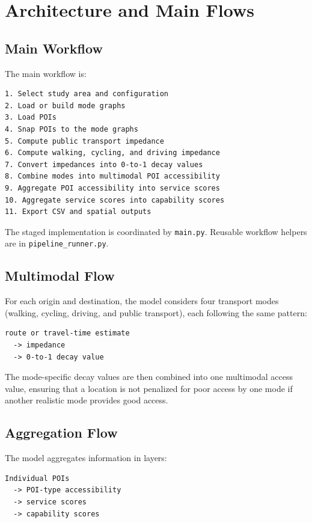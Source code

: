 \documentclass[11pt]{article}
\begin{document}
\section{Architecture and Main Flows}

\subsection*{Main Workflow}

The main workflow is:

\begin{verbatim}
1. Select study area and configuration
2. Load or build mode graphs
3. Load POIs
4. Snap POIs to the mode graphs
5. Compute public transport impedance
6. Compute walking, cycling, and driving impedance
7. Convert impedances into 0-to-1 decay values
8. Combine modes into multimodal POI accessibility
9. Aggregate POI accessibility into service scores
10. Aggregate service scores into capability scores
11. Export CSV and spatial outputs
\end{verbatim}

The staged implementation is coordinated by \texttt{main.py}. Reusable workflow helpers are in \texttt{pipeline\_runner.py}.

\subsection*{Multimodal Flow}

For each origin and destination, the model considers four transport modes (walking, cycling, driving, and public transport), each following the same pattern:

\begin{verbatim}
route or travel-time estimate
  -> impedance
  -> 0-to-1 decay value
\end{verbatim}

The mode-specific decay values are then combined into one multimodal access value, ensuring that a location is not penalized for poor access by one mode if another realistic mode provides good access.

\subsection*{Aggregation Flow}

The model aggregates information in layers:

\begin{verbatim}
Individual POIs
  -> POI-type accessibility
  -> service scores
  -> capability scores
\end{verbatim}
\end{document}
